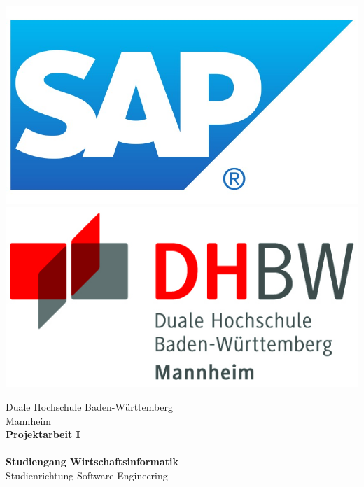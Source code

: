 \begin{titlepage}
\begin{minipage}{\textwidth}
		\vspace{-2cm}
		\noindent \includegraphics[scale=0.14]{img/firmenlogo.jpg} \hfill   \includegraphics{img/logo.jpg}
\end{minipage}
\vspace{1em}
\sffamily
\begin{center}
	\textsf{\large{}Duale Hochschule Baden-W\"urttemberg\\[1.5mm] Mannheim}\\[2em]
	\textsf{\textbf{\Large{}Projektarbeit I}}\\[3mm]
	\textsf{\textbf{\DerTitelDerArbeit}} \\[1.5cm]
	\textsf{\textbf{\Large{}Studiengang Wirtschaftsinformatik}\\[3mm] \textsf{Studienrichtung Software Engineering}}
	
	\vspace{3em}
\vfill

\begin{minipage}{\textwidth}


\end{minipage}
\end{center}
\end{titlepage}
